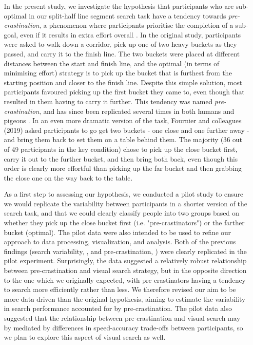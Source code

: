 \documentclass[]{rsos}
\begin{document}
In the present study, we investigate the hypothesis that participants who are sub-optimal in our split-half line segment search task have a tendency towards \textit{pre-crastination}, a phenomenon where participants prioritise the completion of a sub-goal, even if it results in extra effort overall \cite{rosenbaum2014}. In the original study, participants were asked to walk down a corridor, pick up one of two heavy buckets as they passed, and carry it to the finish line. The two buckets were placed at different distances between the start and finish line, and the optimal (in terms of minimising effort) strategy is to pick up the bucket that is furthest from the starting position and closer to the finish line. Despite this simple solution, most participants favoured picking up the first bucket they came to, even though that resulted in them having to carry it further. This tendency was named \textit{pre-crastination}, and has since been replicated several times in both humans \cite{fournier2019task} and pigeons \cite{wasserman2015}. In an even more dramatic version of the task, Fournier and colleagues (2019) asked participants to go get two buckets - one close and one further away - and bring them back to set them on a table behind them. The majority (36 out of 49 participants in the key condition) chose to pick up the close bucket first, carry it out to the further bucket, and then bring both back, even though this order is clearly more effortful than picking up the far bucket and then grabbing the close one on the way back to the table.

As a first step to assessing our hypothesis, we conducted a pilot study to ensure we would replicate the variability between participants in a shorter version of the search task, and that we could clearly classify people into two groups based on whether they pick up the close bucket first (i.e. "pre-crastinators") or the farther bucket (optimal). The pilot data were also intended to be used to refine our approach to data processing, visualization, and analysis. Both of the previous findings (search variability, \cite{nowakowska2017}, and pre-crastination, \cite{fournier2019task}) were clearly replicated in the pilot experiment. Surprisingly, the data suggested a relatively robust relationship between pre-crastination and visual search strategy, but in the opposite direction to the one which we originally expected, with pre-crastinators having a tendency to search more efficiently rather than less. We therefore revised our aim to be more data-driven than the original hypothesis, aiming to estimate the variability in search performance accounted for by pre-crastination. The pilot data also suggested that the relationship between pre-crastination and visual search may by mediated by differences in speed-accuracy trade-offs between participants, so we plan to explore this aspect of visual search as well.  
\end{document}
